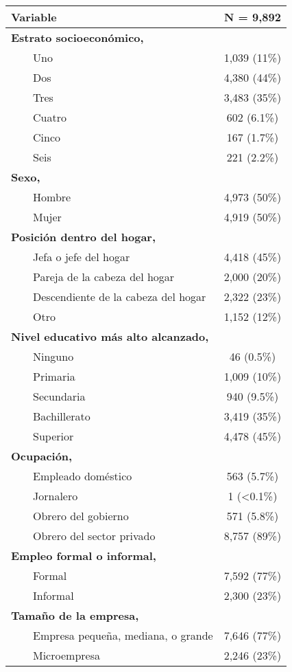 \begin{longtable}{lc}
\toprule
\textbf{Variable} & \textbf{N = 9,892} \\ 
\midrule
\textbf{Estrato socioeconómico,}  &  \\ 
    Uno & 1,039  (11\%) \\ 
    Dos & 4,380  (44\%) \\ 
    Tres & 3,483  (35\%) \\ 
    Cuatro & 602  (6.1\%) \\ 
    Cinco & 167  (1.7\%) \\ 
    Seis & 221  (2.2\%) \\ 
\textbf{Sexo,}  &  \\ 
    Hombre & 4,973  (50\%) \\ 
    Mujer & 4,919  (50\%) \\ 
\textbf{Posición dentro del hogar,}  &  \\ 
    Jefa o jefe del hogar & 4,418  (45\%) \\ 
    Pareja de la cabeza del hogar & 2,000  (20\%) \\ 
    Descendiente de la cabeza del hogar & 2,322  (23\%) \\ 
    Otro & 1,152  (12\%) \\ 
\textbf{Nivel educativo más alto alcanzado,}  &  \\ 
    Ninguno & 46  (0.5\%) \\ 
    Primaria & 1,009  (10\%) \\ 
    Secundaria & 940  (9.5\%) \\ 
    Bachillerato & 3,419  (35\%) \\ 
    Superior & 4,478  (45\%) \\ 
\textbf{Ocupación,}  &  \\ 
    Empleado doméstico & 563  (5.7\%) \\ 
    Jornalero & 1  (<0.1\%) \\ 
    Obrero del gobierno & 571  (5.8\%) \\ 
    Obrero del sector privado & 8,757  (89\%) \\ 
\textbf{Empleo formal o informal,}  &  \\ 
    Formal & 7,592  (77\%) \\ 
    Informal & 2,300  (23\%) \\ 
\textbf{Tamaño de la empresa,}  &  \\ 
    Empresa pequeña, mediana, o grande & 7,646  (77\%) \\ 
    Microempresa & 2,246  (23\%) \\ 

\end{longtable}
